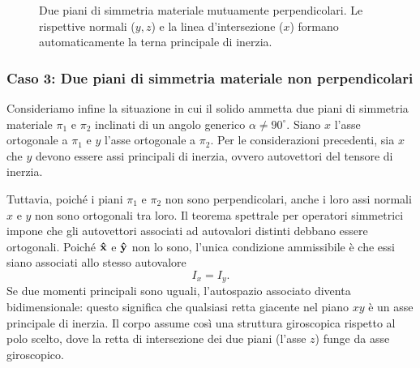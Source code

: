 \begin{figure}[htbp]
\centering
{}
\caption{Due piani di simmetria materiale mutuamente perpendicolari. Le rispettive normali ($y, z$) e la linea d'intersezione ($x$) formano automaticamente la terna principale di inerzia.}
\label{fig:simmetria_ortogonale}
\end{figure}

\subsubsection*{Caso 3: Due piani di simmetria materiale non perpendicolari}
Consideriamo infine la situazione in cui il solido ammetta due piani di simmetria materiale $\pi_1$ e $\pi_2$ inclinati di un angolo generico $\alpha \neq 90^\circ$. Siano $x$ l'asse ortogonale a $\pi_1$ e $y$ l'asse ortogonale a $\pi_2$. Per le considerazioni precedenti, sia $x$ che $y$ devono essere assi principali di inerzia, ovvero autovettori del tensore di inerzia. 

Tuttavia, poiché i piani $\pi_1$ e $\pi_2$ non sono perpendicolari, anche i loro assi normali $x$ e $y$ non sono ortogonali tra loro. Il teorema spettrale per operatori simmetrici impone che gli autovettori associati ad autovalori distinti debbano essere ortogonali. Poiché $\vu{x}$ e $\vu{y}$ non lo sono, l'unica condizione ammissibile è che essi siano associati allo stesso autovalore
\begin{equation*}
    I_x = I_y.
\end{equation*}
Se due momenti principali sono uguali, l'autospazio associato diventa bidimensionale: questo significa che qualsiasi retta giacente nel piano $xy$ è un asse principale di inerzia. Il corpo assume così una struttura giroscopica rispetto al polo scelto, dove la retta di intersezione dei due piani (l'asse $z$) funge da asse giroscopico.

